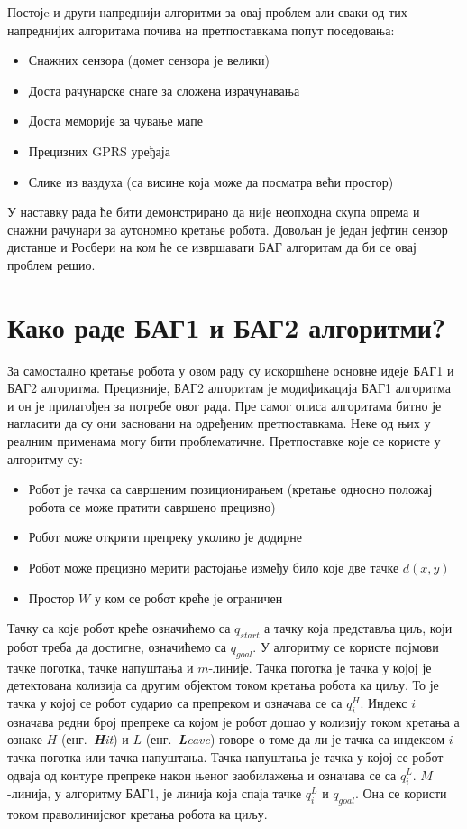 \documentclass[12pt,oneside]{memoir}
\theoremstyle{remark}
\begin{document}
Постојe и други напреднији алгоритми за овај проблем али сваки од тих напреднијих алгоритама почива на претпоставкама попут поседовања:
\begin{itemize}
\item Снажних сензора (домет сензора је велики)
\item Доста рачунарске снаге за сложена израчунавања
\item Доста меморије за чување мапе
\item Прецизних GPRS уређаја
\item Слике из ваздуха (са висине која може да посматра већи простор)
\end{itemize}

У наставку рада ће бити демонстрирано да није неопходна скупа опрема и снажни рачунари за аутономно кретање робота. Довољан је један јефтин сензор дистанце и Росбери  на ком ће се извршавати БАГ алгоритам да би се овај проблем решио.

\section{Како раде БАГ1 и БАГ2 алгоритми?}
За самостално кретање робота у овом раду су искоршћене основне идеје БАГ1 и БАГ2 алгоритма. Прецизније, БАГ2 алгоритам је модификација БАГ1 алгоритма и он је прилагођен за потребе овог рада. Пре самог описа алгоритама битно је нагласити да су они засновани на одређеним претпоставкама. Неке од њих у реалним применама могу бити проблематичне. Претпоставке које се користе у алгоритму су:
\begin{itemize}
\item Робот је тачка са савршеним позиционирањем (кретање односно положај робота се може пратити савршено прецизно)
\item Робот може открити препреку уколико је додирне
\item Робот може прецизно мерити растојање између било које две тачке $d(x,y)$
\item Простор $W$ у ком се робот креће је ограничен
\end{itemize}

Тачку са које робот креће означићемо са $q_{start}$ а тачку која представља циљ, који робот треба да достигне, означићемо са $q_{goal}$. У алгоритму се користе појмови тачке поготка, тачке напуштања и $m$-линије. Тачка поготка је тачка у којој је детектована колизија са другим објектом током кретања робота ка циљу. То је тачка у којој се робот сударио са препреком и означава се са $q_i^H$. Индекс $i$ означава редни број препреке са којом је робот дошао у колизију током кретања а ознаке $H$  (енг.~{\em \textbf{H}it}) и $L$ (енг.~{\em \textbf{L}eave}) говоре о томе да ли је тачка са индексом $i$ тачка поготка или тачка напуштања. Тачка напуштања је тачка у којој се робот одваја од контуре препреке након њеног заобилажења и означава се са $q_i^L$. $M$-линија, у алгоритму БАГ1, је линија која спаја тачке $q_i^L$ и $q_{goal}$. Она се користи током праволинијског кретања робота ка циљу.
\end{document}
